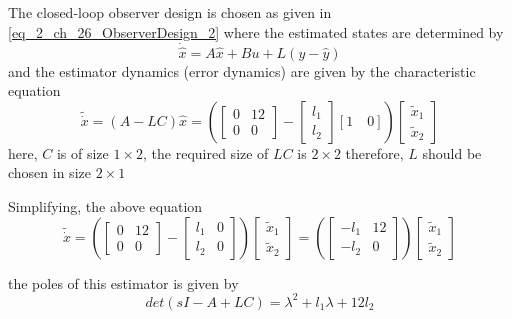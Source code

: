 The closed-loop observer design is chosen as given in \eqref{eq_2_ch_26_ObserverDesign_2} where the estimated states are determined by
\begin{equation}\label{Eq_2_ch_26_ExObserverDesign2_2}
	\dot{\hat{x}} = A \hat{x} + Bu + L (y - \hat{y})
\end{equation}
and the estimator dynamics (error dynamics) are given by the characteristic equation
\begin{equation}
	\tilde{\dot{x}} = (A - LC)\hat{x} = \left( \begin{bmatrix}
	0 & 12 \\ 0 & 0
	\end{bmatrix} - \begin{bmatrix}
	l_1 \\ l_2
	\end{bmatrix} [1 \quad 0]\right) \begin{bmatrix}
	\tilde{x}_{1} \\ \tilde{x}_{2}
	\end{bmatrix}
\end{equation}
here, $C$ is of size $1\times2$, the required size of $LC$ is $2\times2$ therefore, $L$ should be chosen in size $2\times1$

Simplifying, the above equation
\begin{equation}
\tilde{\dot{x}} = \left( \begin{bmatrix}
0 & 12 \\ 0 & 0
\end{bmatrix} - \begin{bmatrix}
l_1 & 0 \\ l_2 & 0
\end{bmatrix}\right)\begin{bmatrix}
\tilde{x}_{1} \\ \tilde{x}_{2}
\end{bmatrix} = \left( \begin{bmatrix}
-l_1 & 12 \\ -l_2 & 0
\end{bmatrix}\right)\begin{bmatrix}
\tilde{x}_{1} \\ \tilde{x}_{2}
\end{bmatrix}
\end{equation}

the poles of this estimator is given by
\begin{equation}
	det(sI - A + LC) = \lambda^2 + l_1 \lambda + 12 l_2
\end{equation}

